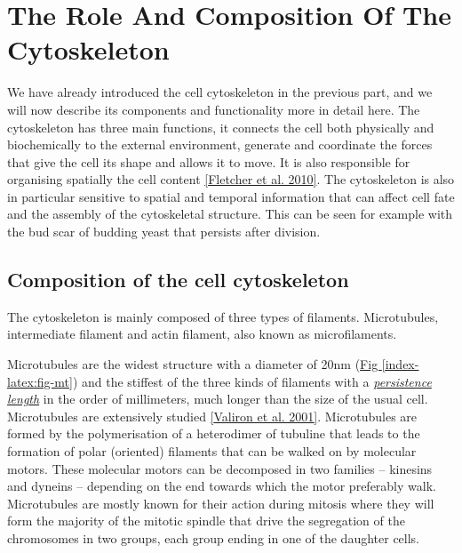 \documentclass[A4paperpaper,11pt,english]{sphinxmanual}
\begin{document}
\section{The Role And Composition Of The Cytoskeleton}
\label{index-latex:the-role-and-composition-of-the-cytoskeleton}\label{index-latex:role-of-actin}
We have already introduced the cell cytoskeleton in the previous part, and we will now
describe its components and functionality more in detail here.  The cytoskeleton
has three main functions, it connects the cell both physically
and biochemically to the external environment, generate and coordinate the
forces that give the cell its shape and allows it to move. It is also
responsible for organising spatially  the cell content {\hyperref[index-latex:fletcher2010]{{[}Fletcher et al. 2010{]}}}.
The cytoskeleton is also in particular sensitive to spatial and temporal
information that can affect cell fate and the assembly of the cytoskeletal
structure. This can be seen for example with the bud scar of budding yeast that
persists after division.


\subsection{Composition of the cell cytoskeleton}
\label{index-latex:composition-of-the-cell-cytoskeleton}
The cytoskeleton is mainly composed of three types of filaments.
Microtubules, intermediate filament and actin filament, also known as
microfilaments.

Microtubules are the widest structure with a diameter of 20nm (\hyperref[index-latex:fig-mt]{Fig  \ref*{index-latex:fig-mt}})
and the
stiffest of the three kinds of filaments with a {\hyperref[index-latex:viscoelastic]{\emph{persistence length}}} in the order
of millimeters, much longer than the size of the usual cell.
Microtubules are extensively studied {\hyperref[index-latex:valiron2001]{{[}Valiron et al. 2001{]}}}.
Microtubules are formed by the polymerisation of a heterodimer of tubuline
that leads to the formation of polar (oriented) filaments that can be walked on
by molecular motors. These molecular motors can be decomposed in two families –
kinesins and dyneins – depending on the end towards which the motor preferably
walk.  Microtubules are mostly known for their action during mitosis
where they will form the majority of the mitotic spindle that drive the segregation
of the chromosomes in two groups, each group ending in one of the daughter
cells.
\end{document}
